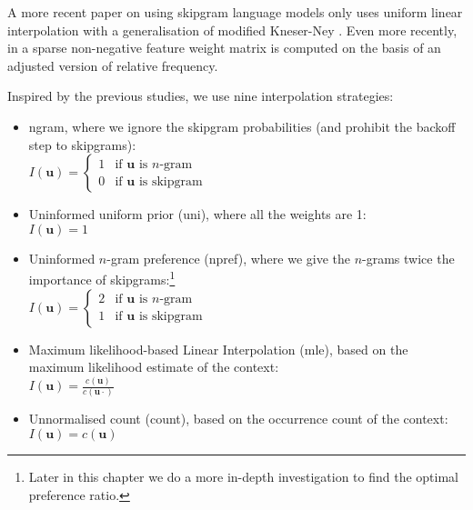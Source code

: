
  A more recent paper on using skipgram language models only uses uniform linear interpolation with a generalisation of modified Kneser-Ney \autocite{pickhardt2014generalized}. Even more recently, in \autocite{pelemans2016sparse} a sparse non-negative feature weight matrix is computed on the basis of an adjusted version of relative frequency.
  
Inspired by the previous studies, we use nine interpolation strategies:
  
  \begin{itemize}
  \item \textsf{ngram}, where we ignore the skipgram probabilities (and prohibit the backoff step to skipgrams): \\
	$I(\mathbf{u}) =
  \begin{cases}
    1 & \text{if } \mathbf{u} \text{ is }n\text{-gram} \\
    0 & \text{if } \mathbf{u} \text{ is skipgram}
  \end{cases}$
\item \textsf{Uninformed uniform prior (uni)}, where all the weights are 1:\\ 
	$ I(\mathbf{u}) = 1 $
\item \textsf{Uninformed $n$-gram preference (npref)}, where we give the $n$-grams twice the importance of skipgrams:\footnote{Later in this chapter we do a more in-depth investigation to find the optimal preference ratio.} \\
	$I(\mathbf{u}) =
  \begin{cases}
    2 & \text{if } \mathbf{u} \text{ is }n\text{-gram} \\
    1 & \text{if } \mathbf{u} \text{ is skipgram}
  \end{cases}$
  \item \textsf{Maximum likelihood-based Linear Interpolation (mle)}, based on the maximum likelihood estimate of the context: \\[0.5ex]
	$ I(\mathbf{u}) = \displaystyle \frac{c(\mathbf{u})}{c(\mathbf{u}\cdot)} $ \\
\item \textsf{Unnormalised count (count)}, based on the occurrence count of the context: \\[0.5ex]
$ I(\mathbf{u}) = \displaystyle c(\mathbf{u}) $ \\

\end{itemize}
